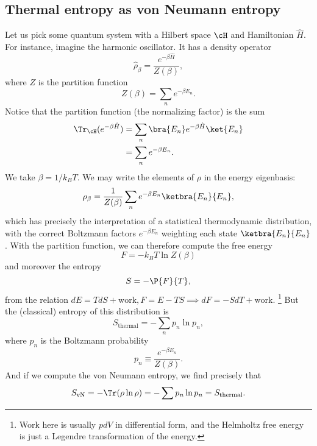 \subsection*{Thermal entropy as von Neumann entropy}
Let us pick some quantum system with a Hilbert space $\cH$ and Hamiltonian $\hat H$. For instance, imagine the harmonic oscillator. It has a density operator
\begin{equation}
    \hat \rho_\beta = \frac{e^{-\beta \hat H}}{Z(\beta)},
\end{equation}
where $Z$ is the partition function
\begin{equation}
    Z(\beta) = \sum_n e^{-\beta E_n}.
\end{equation}
Notice that the partition function (the normalizing factor) is the sum
\begin{align}
    \Tr_{\cH} (e^{-\beta \hat H}) &= \sum_n \bra{E_n} e^{-\beta \hat H} \ket{E_n}\\
        &= \sum_n e^{-\beta E_n}.
\end{align}
We take $\beta = 1/k_B T$. We may write the elements of $\rho$ in the energy eigenbasis:
\begin{equation}
    \rho_\beta = \frac{1}{Z(\beta) } \sum_n e^{-\beta E_n} \ketbra{E_n}{E_n},
\end{equation}
which has precisely the interpretation of a statistical thermodynamic distribution, with the correct Boltzmann factors $e^{-\beta E_n}$ weighting each state $\ketbra{E_n}{E_n}$. With the partition function, we can therefore compute the free energy
\begin{equation}
    F= -k_B T \ln Z(\beta)
\end{equation}
and moreover the entropy
\begin{equation}
    S= -\P{F}{T},
\end{equation}
from the relation $dE=TdS + \text{work}, F=E-TS \implies dF = -SdT +\text{work}$.%
    \footnote{Work here is usually $pdV$ in differential form, and the Helmholtz free energy is just a Legendre transformation of the energy.}
But the (classical) entropy of this distribution is 
\begin{equation}
    S_\text{thermal}=-\sum_n p_n \ln p_n,
\end{equation}
where $p_n$ is the Boltzmann probability
\begin{equation}
    p_n \equiv \frac{e^{-\beta E_n}}{Z(\beta)}.
\end{equation}
And if we compute the von Neumann entropy, we find precisely that
\begin{equation}
    S_\text{vN} = -\Tr(\rho \ln \rho) = -\sum p_n \ln p_n = S_\text{thermal}.
\end{equation}

